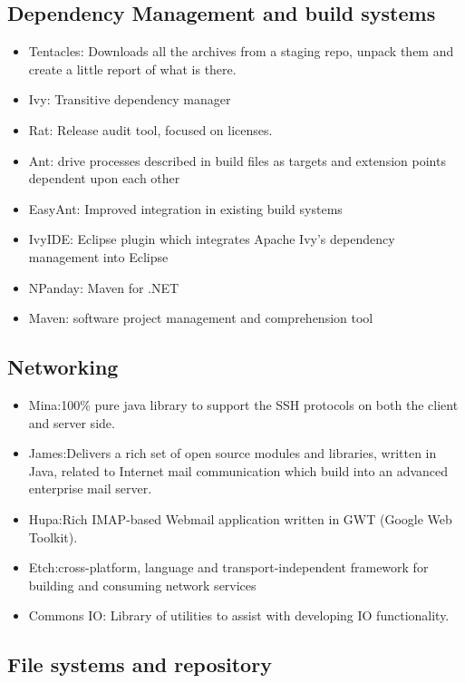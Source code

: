 \documentclass[12pt]{report}
\providecommand{\tightlist}{%
  \setlength{\itemsep}{0pt}\setlength{\parskip}{0pt}}
\begin{document}
\subsection{Dependency Management and build
systems}\label{dependency-management-and-build-systems}

\begin{itemize}
\tightlist
\item
  Tentacles: Downloads all the archives from a staging repo, unpack them
  and create a little report of what is there.
\item
  Ivy: Transitive dependency manager
\item
  Rat: Release audit tool, focused on licenses.
\item
  Ant: drive processes described in build files as targets and extension
  points dependent upon each other
\item
  EasyAnt: Improved integration in existing build systems
\item
  IvyIDE: Eclipse plugin which integrates Apache Ivy's dependency
  management into Eclipse
\item
  NPanday: Maven for .NET
\item
  Maven: software project management and comprehension tool
\end{itemize}

\subsection{Networking}\label{networking}

\begin{itemize}
\tightlist
\item
  Mina:100\% pure java library to support the SSH protocols on both the
  client and server side.
\item
  James:Delivers a rich set of open source modules and libraries,
  written in Java, related to Internet mail communication which build
  into an advanced enterprise mail server.
\item
  Hupa:Rich IMAP-based Webmail application written in GWT (Google Web
  Toolkit).
\item
  Etch:cross-platform, language and transport-independent framework for
  building and consuming network services
\item
  Commons IO: Library of utilities to assist with developing IO
  functionality.
\end{itemize}

\subsection{File systems and
repository}\label{file-systems-and-repository}
\end{document}
